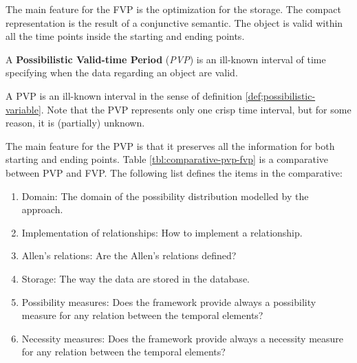\vspace*{13pt}


The main feature for the FVP is the optimization for the storage. The compact representation is the result of a conjunctive semantic. The object is valid within all the time points inside the starting and ending points.


\begin{definition}
A \textbf{Possibilistic Valid-time Period} (\emph{PVP}) is an ill-known interval of time specifying when the data regarding an object are valid.
\end{definition}
A PVP is an ill-known interval in the sense of definition \ref{def;possibilistic-variable}. Note that the PVP represents only one crisp time interval, but for some reason, it is (partially) unknown.

The main feature for the PVP is that it preserves all the information for both starting and ending points\cite{Pons2011,Pons2012}. Table \ref{tbl:comparative-pvp-fvp} is a comparative between PVP and FVP. The following list defines the items in the comparative:

\begin{enumerate}
\item Domain: The domain of the possibility distribution modelled by the approach.
\item Implementation of relationships: How to implement a relationship.
\item Allen's relations: Are the Allen's relations defined?
\item Storage: The way the data are stored in the database.
\item Possibility measures: Does the framework provide always a possibility measure for any relation between the temporal elements?
\item Necessity measures:  Does the framework provide always a necessity measure for any relation between the temporal elements?
\end{enumerate}


